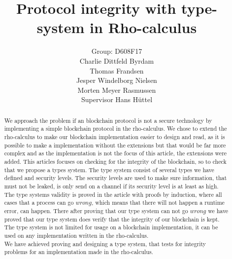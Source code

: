 \mainmatter  %

\title{Protocol integrity with type-system in Rho-calculus}




\author{Group: D608F17\\Charlie Dittfeld Byrdam\\Thomas Frandsen\\Jesper Windelborg Nielsen\\Morten Meyer Rasmussen\\Supervisor Hans Hüttel}




\toctitle{}
\tocauthor{}
\maketitle
\begin{abstract}
We approach the problem if an blockchain protocol is not a secure technology by implementing a simple blockchain protocol in the rho-calculus. We chose to extend the rho-calculus to make our blockchain implementation easier to design and read, as it is possible to make a implementation without the extensions but that would be far more complex and as the implementation is not the focus of this article, the extensions were added. This articles focuses on checking for the integrity of the blockchain, so to check that we propose a types system. The type system consist of several types we have defined and security levels. The security levels are used to make sure information, that must not be leaked, is only send on a channel if its security level is at least as high.\\
    The type systems validity is proved in the article with proofs by induction, where all cases that a process can go \ensuremath{wrong}, which means that there will not happen a runtime error, can happen. There after proving that our type system can not go \ensuremath{wrong} we have proved that our type system does verify that the integrity of our blockchain is kept. The type system is not limited for usage on a blockchain implementation, it can be used on any implementation written in the rho-calculus.\\
We have achieved proving and designing a type system, that tests for integrity problems for an implementation made in the rho-calculus.
\end{abstract}
\clearpage
